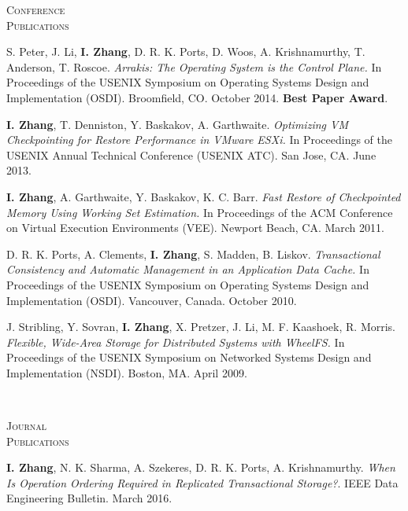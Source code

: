 \documentclass[10pt,times]{report}
\newlength{\sectiongap}
\newlength{\sectioncolwidth}
\newlength{\colgap}
\newlength{\stuffwidth}
\newenvironment{rtable}{
  \begin{minipage}{\textwidth}
  }{
  \end{minipage}
}
\newenvironment{rsection}[1]{
  \begin{minipage}[t]{\sectioncolwidth}
    \textsc{#1}
  \end{minipage}
  \hspace{\colgap}
  \begin{minipage}[t]{\stuffwidth}
  }{
    \removelastskip
  \end{minipage}
  \\[\sectiongap]
}
\begin{document}
\begin{rtable}
\begin{rsection}{Conference\\Publications}
   S. Peter, J. Li, \textbf{I. Zhang}, D. R. K. Ports, D.  Woos,
   A. Krishnamurthy, T. Anderson, T. Roscoe.  \textit{Arrakis: The
     Operating System is the Control Plane.}  In Proceedings of the
   USENIX Symposium on Operating Systems Design and Implementation
   (OSDI).  Broomfield, CO. October 2014. \textbf{Best Paper
     Award}.\\\vspace{-0.5em}

   \textbf{I. Zhang}, T. Denniston, Y. Baskakov, A. Garthwaite.
   \textit{Optimizing VM Checkpointing for Restore Performance in
     VMware ESXi.}  In Proceedings of the USENIX Annual Technical
   Conference (USENIX ATC).  San Jose, CA. June 2013.\\\vspace{-0.5em}

   \textbf{I. Zhang}, A. Garthwaite, Y. Baskakov,
   K. C. Barr. \textit{Fast Restore of Checkpointed Memory Using
     Working Set Estimation.}  In Proceedings of the ACM Conference on
   Virtual Execution Environments (VEE). Newport Beach, CA. March
   2011.\\\vspace{-0.5em}

   D. R. K. Ports, A. Clements, \textbf{I. Zhang}, S. Madden,
   B. Liskov. \textit{Transactional Consistency and Automatic
     Management in an Application Data Cache.}  In Proceedings of the
   USENIX Symposium on Operating Systems Design and Implementation
   (OSDI). Vancouver, Canada. October 2010.\\\vspace{-0.5em}

   J. Stribling, Y. Sovran, \textbf{I. Zhang}, X. Pretzer, J. Li,
   M. F. Kaashoek, R. Morris. \textit{Flexible, Wide-Area Storage for
     Distributed Systems with WheelFS.}  In Proceedings of the USENIX
   Symposium on Networked Systems Design and
   Implementation (NSDI).  Boston, MA. April 2009. \\
  \end{rsection}

  \begin{rsection}{Journal\\Publications}
    \textbf{I. Zhang}, N. K. Sharma, A. Szekeres, D. R. K. Ports,
    A. Krishnamurthy. \textit{When Is Operation Ordering Required in
      Replicated Transactional Storage?}.  IEEE Data Engineering
    Bulletin. March 2016.\\\vspace{-0.5em}


\end{rsection}
\end{rtable}
\end{document}
